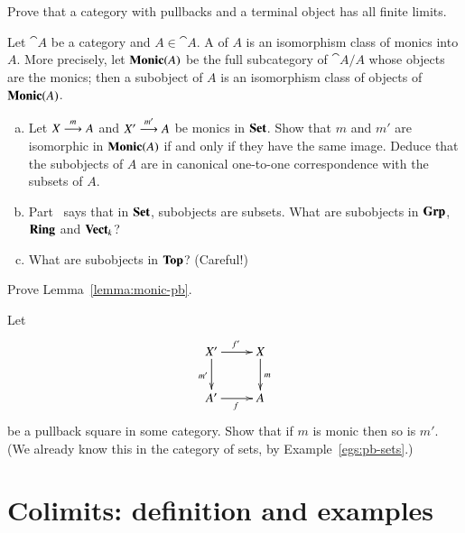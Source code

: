 \begin{question}
Prove that a category with pullbacks%
%
%
and a terminal object has all finite limits.
\end{question}


\begin{question}
\label{ex:subobjects}
Let $\cat{A}$ be a category and $A \in \cat{A}$.  A %
%
%
of $A$ is an isomorphism class of monics into $A$.  More precisely, let
$\mathbf{Monic}(A)$ be the full subcategory of $\cat{A}/A$ whose objects are
the monics; then a subobject of $A$ is an isomorphism class of objects of
$\mathbf{Monic}(A)$.
%
\begin{enumerate}[(b)]
\item
\label{part:sub-Set}
Let $X \stackrel{m}{\longrightarrow} A$ and $X' \stackrel{m'}{\longrightarrow} A$ be monics in $\mathbf{Set}$.  Show that
$m$ and $m'$ are isomorphic in $\mathbf{Monic}(A)$ if and only if they have
the same image.  Deduce that the subobjects of $A$ are in canonical
one-to-one correspondence with the subsets%
%
%
of $A$.

\item
Part~ says that in $\mathbf{Set}$, subobjects are subsets.
What are subobjects in $\mathbf{Grp}$, $\mathbf{Ring}$ and $\mathbf{Vect}_k$?

\item
What are subobjects in $\mathbf{Top}$?  (Careful!)
\end{enumerate}
\end{question}


\begin{question}
\label{ex:monic-pb}
Prove Lemma~\ref{lemma:monic-pb}.
\end{question}


\begin{question}
\label{ex:pb-monic}
Let
\[
\xymatrix{
X' \ar[r]^{f'} \ar[d]_{m'}      &
X \ar[d]^m      \\
A' \ar[r]_f     &
A
}
%
\index{pullback!monic@of monic}%
\index{monic!pullback of}
%
\]
be a pullback square in some category.  Show that if $m$ is monic then so
is $m'$.  (We already know this in the category of sets, by
Example~\ref{egs:pb-sets}.)
\end{question}



\section{Colimits: definition and examples}


